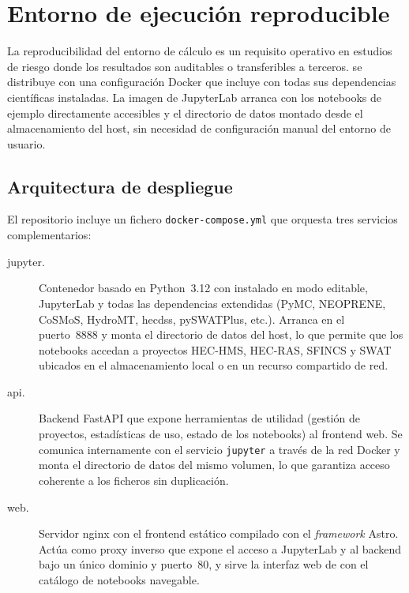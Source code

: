 \section{Entorno de ejecución reproducible}
\label{sec:entorno_despliegue}

La reproducibilidad del entorno de cálculo es un requisito operativo en estudios de riesgo donde los resultados son auditables o transferibles a terceros. \hydra se distribuye con una configuración Docker que incluye \pyhydra con todas sus dependencias científicas instaladas. La imagen de JupyterLab arranca con los notebooks de ejemplo directamente accesibles y el directorio de datos montado desde el almacenamiento del host, sin necesidad de configuración manual del entorno de usuario.

\subsection{Arquitectura de despliegue}

El repositorio incluye un fichero \texttt{docker-compose.yml} que orquesta tres servicios complementarios:

\begin{description}
  \item[jupyter.] Contenedor basado en Python~3.12 con \pyhydra instalado en modo editable, JupyterLab y todas las dependencias extendidas (PyMC, NEOPRENE, CoSMoS, HydroMT, hecdss, pySWATPlus, etc.). Arranca en el puerto~8888 y monta el directorio de datos del host, lo que permite que los notebooks accedan a proyectos HEC-HMS, HEC-RAS, SFINCS y SWAT ubicados en el almacenamiento local o en un recurso compartido de red.

  \item[api.] Backend FastAPI que expone herramientas de utilidad (gestión de proyectos, estadísticas de uso, estado de los notebooks) al frontend web. Se comunica internamente con el servicio \texttt{jupyter} a través de la red Docker y monta el directorio de datos del mismo volumen, lo que garantiza acceso coherente a los ficheros sin duplicación.

  \item[web.] Servidor nginx con el frontend estático compilado con el \emph{framework} Astro. Actúa como proxy inverso que expone el acceso a JupyterLab y al backend bajo un único dominio y puerto~80, y sirve la interfaz web de \hydra con el catálogo de notebooks navegable.
\end{description}

